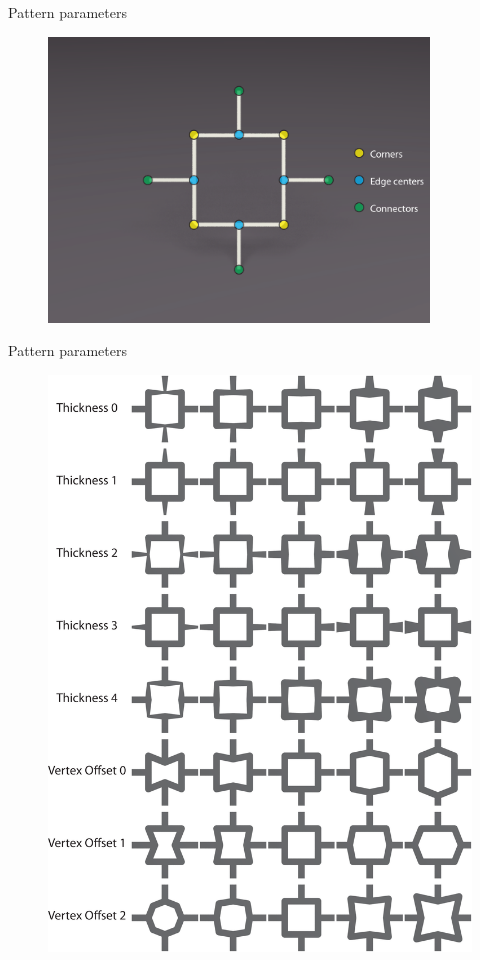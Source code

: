 \begin{frame}{Pattern parameters}
\begin{figure}
\includegraphics[width=0.9\textwidth]{Images/box_2D_parameters.pdf}
\end{figure}
\end{frame}

\begin{frame}{Pattern parameters}
\begin{figure}
\hspace{\fill}
\includegraphics[height=0.8\textheight]{Images/box_2D_param.pdf}
\hspace{\fill}
\end{figure}
\end{frame}


